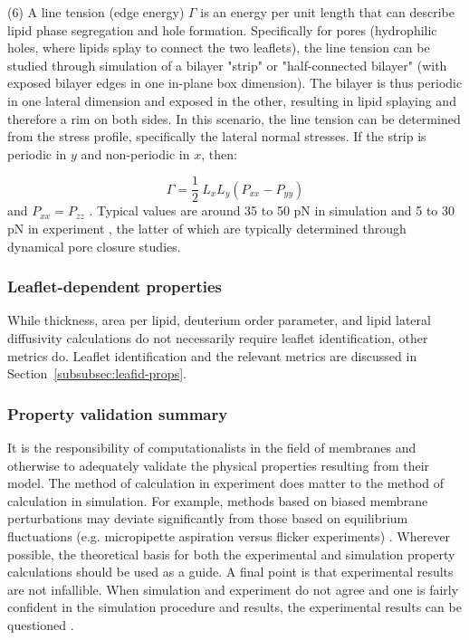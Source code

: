 \documentclass[9pt,bestpractices]{livecoms}
\begin{document}
(6) A line tension (edge energy) $\Gamma$ is an energy per unit length that can describe lipid phase segregation and hole formation.
Specifically for pores (hydrophilic holes, where lipids splay to connect the two leaflets), the line tension can be studied through simulation of a bilayer "strip" or "half-connected bilayer" (with exposed bilayer edges in one in-plane box dimension).
The bilayer is thus periodic in one lateral dimension and exposed in the other, resulting in lipid splaying and therefore a rim on both sides.
In this scenario, the line tension can be determined from the stress profile, specifically the lateral normal stresses.
If the strip is periodic in $y$ and non-periodic in $x$, then:

\begin{equation}\label{eq:11}
	\Gamma = \frac{1}{2}\ L_x L_y (P_{xx} - P_{yy})
\end{equation}
and $P_{xx} = P_{zz}$ \cite{Tolpekina2004b}.
Typical values are around 35 to 50 pN in simulation \cite{Tolpekina2004b,Wohlert2006} and 5 to 30 pN in experiment \cite{Brochard-Wyarta2000,Moroz1996,Zhelev1993}, the latter of which are typically determined through dynamical pore closure studies.

\subsubsection{Leaflet-dependent properties}
\label{subsubsec:leafprops}
While thickness, area per lipid, deuterium order parameter, and lipid lateral diffusivity calculations do not necessarily require leaflet identification, other metrics do. Leaflet identification and the relevant metrics are discussed in Section~\ref{subsubsec:leafid-props}.

\subsubsection{Property validation summary}
\label{subsubsec:validationsumm}
It is the responsibility of computationalists in the field of membranes and otherwise to adequately validate the physical properties resulting from their model.
The method of calculation in experiment does matter to the method of calculation in simulation.
For example, methods based on biased membrane perturbations may deviate significantly from those based on equilibrium fluctuations (e.g. micropipette aspiration versus flicker experiments) \cite{Venable2015}.
Wherever possible, the theoretical basis for both the experimental and simulation property calculations should be used as a guide.
A final point is that experimental results are not infallible.
When simulation and experiment do not agree and one is fairly confident in the simulation procedure and results, the experimental results can be questioned \cite{Venable2015}.
\end{document}

